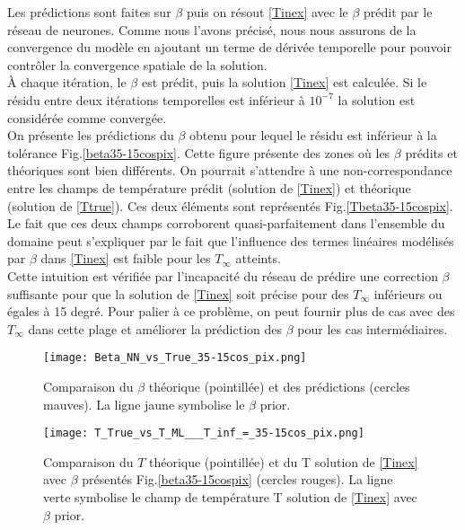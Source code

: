 \documentclass[a4paper,12pt]{article}
\newcommand{\tinf}{$T_\infty$}
\numberwithin{equation}{section} %
\begin{document}
\noindent Les prédictions sont faites sur $\beta$ puis on résout \eqref{Tinex} avec le $\beta$ prédit par le réseau de neurones. Comme nous l'avons précisé, nous nous assurons de la convergence du modèle en ajoutant un terme de dérivée temporelle pour pouvoir contrôler la convergence spatiale de la solution. \\
À chaque itération, le $\beta$ est prédit, puis la solution \eqref{Tinex} est calculée. Si le résidu entre deux itérations temporelles est inférieur à $10^{-7}$ la solution est considérée comme convergée.\\

\noindent On présente les prédictions du $\beta$ obtenu pour lequel le résidu est inférieur à la tolérance Fig.\eqref{beta35-15cospix}. Cette figure présente des zones où les $\beta$ prédits et théoriques sont bien différents. On pourrait s'attendre à une non-correspondance entre les champs de température prédit (solution de \eqref{Tinex}) et théorique (solution de \eqref{Ttrue}). Ces deux éléments sont représentés Fig.\eqref{Tbeta35-15cospix}.\\
Le fait que ces deux champs corroborent quasi-parfaitement dans l'ensemble du domaine peut s'expliquer par le fait que l'influence des termes linéaires modélisés par $\beta$ dans \eqref{Tinex} est faible pour les \tinf $ $ atteints.\\
Cette intuition est vérifiée par l'incapacité du réseau de prédire une correction $\beta$ suffisante pour que la solution de \eqref{Tinex} soit précise pour des \tinf $ $  inférieurs ou égales à 15 degré. Pour palier à ce problème, on peut fournir plus de cas avec des \tinf $ $ dans cette plage et améliorer la prédiction des $\beta$ pour les cas intermédiaires.\\
\vspace{-0.3cm}
\begin{figure}[!ht]
\centering
\texttt{[image: Beta\_NN\_vs\_True\_35-15cos\_pix.png]}
\vspace{-3mm}
\caption{\small{Comparaison du $\beta$ théorique (pointillée) et des prédictions (cercles mauves). La ligne jaune symbolise le $\beta$ prior.}}
\label{beta35-15cospix}
\end{figure}

\begin{figure}[!ht]
\centering
\texttt{[image: T\_True\_vs\_T\_ML\_\_\_T\_inf\_=\_35-15cos\_pix.png]}
\vspace{-3mm}
\caption{\small{Comparaison du $T$ théorique (pointillée) et du T solution de \eqref{Tinex} avec $\beta$ présentés Fig.\eqref{beta35-15cospix} (cercles rouges). La ligne verte symbolise le champ de température T solution de \eqref{Tinex} avec $\beta$ prior.}}
\label{Tbeta35-15cospix}
\end{figure}
\end{document}

